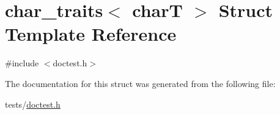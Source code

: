 \hypertarget{structchar__traits}{}\section{char\+\_\+traits$<$ charT $>$ Struct Template Reference}
\label{structchar__traits}


{\ttfamily \#include $<$doctest.\+h$>$}



The documentation for this struct was generated from the following file\+:\begin{DoxyCompactItemize}
\item 
tests/\hyperlink{doctest_8h}{doctest.\+h}\end{DoxyCompactItemize}

